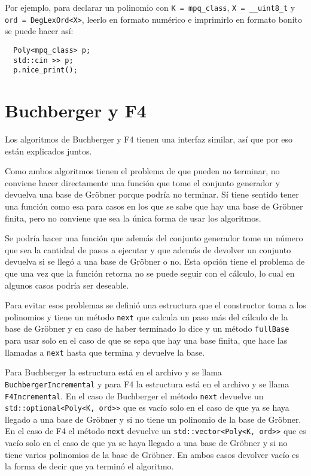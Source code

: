 \documentclass[12pt]{report}
\theoremstyle{customstyle}
\theoremstyle{factstyle}
\begin{document}
Por ejemplo, para declarar un polinomio con \texttt{K = mpq\_class}, \texttt{X = \_\_uint8\_t} y \texttt{ord = DegLexOrd<X>}, leerlo en formato numérico e imprimirlo en formato bonito se puede hacer así:

\begin{verbatim}
  Poly<mpq_class> p;
  std::cin >> p;
  p.nice_print();
\end{verbatim}

\section{Buchberger y F4}

Los algoritmos de Buchberger y F4 tienen una interfaz similar, así que por eso están explicados juntos.

Como ambos algoritmos tienen el problema de que pueden no terminar, no conviene hacer directamente una función que tome el conjunto generador y devuelva una base de Gröbner porque podría no terminar. Sí tiene sentido tener una función como esa para casos en los que se sabe que hay una base de Gröbner finita, pero no conviene que sea la única forma de usar los algoritmos.

Se podría hacer una función que además del conjunto generador tome un número que sea la cantidad de pasos a ejecutar y que además de devolver un conjunto devuelva si se llegó a una base de Gröbner o no. Esta opción tiene el problema de que una vez que la función retorna no se puede seguir con el cálculo, lo cual en algunos casos podría ser deseable.

Para evitar esos problemas se definió una estructura que el constructor toma a los polinomios y tiene un método \texttt{next} que calcula un paso más del cálculo de la base de Gröbner y en caso de haber terminado lo dice y un método \texttt{fullBase} para usar solo en el caso de que se sepa que hay una base finita, que hace las llamadas a \texttt{next} hasta que termina y devuelve la base.

Para Buchberger la estructura está en el archivo  y se llama \texttt{BuchbergerIncremental} y para F4 la estructura está en el archivo  y se llama \texttt{F4Incremental}. En el caso de Buchberger el método \texttt{next} devuelve un \texttt{std::optional<Poly<K, ord>>} que es vacío solo en el caso de que ya se haya llegado a una base de Gröbner y si no tiene un polinomio de la base de Gröbner. En el caso de F4 el método \texttt{next} devuelve un \texttt{std::vector<Poly<K, ord>>} que es vacío solo en el caso de que ya se haya llegado a una base de Gröbner y si no tiene varios polinomios de la base de Gröbner. En ambos casos devolver vacío es la forma de decir que ya terminó el algoritmo.
\end{document}
